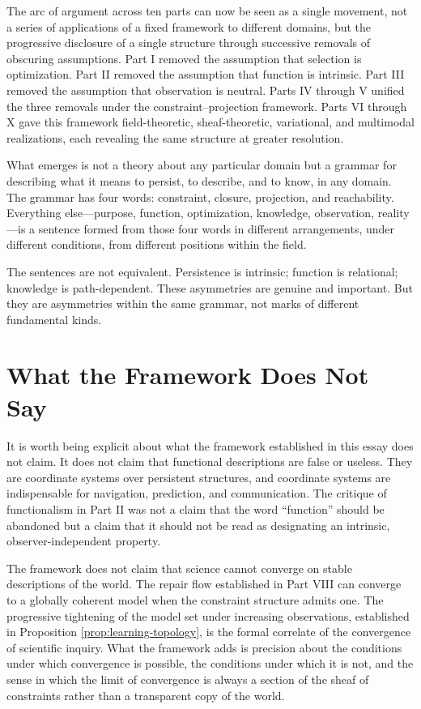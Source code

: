 \documentclass[12pt, a4paper, oneside]{article}
\theoremstyle{plain}
\theoremstyle{definition}
\theoremstyle{remark}
\begin{document}
The arc of argument across ten parts can now be seen as a single movement, not a series of applications of a fixed framework to different domains, but the progressive disclosure of a single structure through successive removals of obscuring assumptions. Part I removed the assumption that selection is optimization. Part II removed the assumption that function is intrinsic. Part III removed the assumption that observation is neutral. Parts IV through V unified the three removals under the constraint--projection framework. Parts VI through X gave this framework field-theoretic, sheaf-theoretic, variational, and multimodal realizations, each revealing the same structure at greater resolution.

What emerges is not a theory about any particular domain but a grammar for describing what it means to persist, to describe, and to know, in any domain. The grammar has four words: constraint, closure, projection, and reachability. Everything else---purpose, function, optimization, knowledge, observation, reality---is a sentence formed from those four words in different arrangements, under different conditions, from different positions within the field.

The sentences are not equivalent. Persistence is intrinsic; function is relational; knowledge is path-dependent. These asymmetries are genuine and important. But they are asymmetries within the same grammar, not marks of different fundamental kinds.

\section{What the Framework Does Not Say}

It is worth being explicit about what the framework established in this essay does not claim. It does not claim that functional descriptions are false or useless. They are coordinate systems over persistent structures, and coordinate systems are indispensable for navigation, prediction, and communication. The critique of functionalism in Part II was not a claim that the word ``function'' should be abandoned but a claim that it should not be read as designating an intrinsic, observer-independent property.

The framework does not claim that science cannot converge on stable descriptions of the world. The repair flow established in Part VIII can converge to a globally coherent model when the constraint structure admits one. The progressive tightening of the model set under increasing observations, established in Proposition \ref{prop:learning-topology}, is the formal correlate of the convergence of scientific inquiry. What the framework adds is precision about the conditions under which convergence is possible, the conditions under which it is not, and the sense in which the limit of convergence is always a section of the sheaf of constraints rather than a transparent copy of the world.
\end{document}
